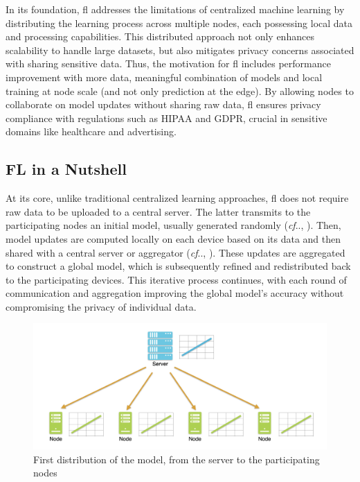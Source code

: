 \documentclass[conference]{IEEEtran}
\makeatletter
\DeclareRobustCommand\onedot{\futurelet\@let@token\@onedot}
\def\@onedot{\ifx\@topicslet@token.\else.\null\fi\xspace}
\def\cf{\emph{cf}\onedot} \def\Cf{\emph{C.f}\onedot}
\makeatother
\begin{document}
In its foundation, \gls{fl} addresses the limitations of centralized machine learning by distributing the learning process across multiple nodes, each possessing local data and processing capabilities.
This distributed approach not only enhances scalability to handle large datasets, but also mitigates privacy concerns associated with sharing sensitive data.
Thus, the motivation for \gls{fl} includes performance improvement with more data, meaningful combination of models and local training at node scale (and not only prediction at the edge).
By allowing nodes to collaborate on model updates without sharing raw data, \gls{fl} ensures privacy compliance with regulations such as HIPAA and GDPR, crucial in sensitive domains like healthcare and advertising.


\subsection{FL in a Nutshell}

At its core, unlike traditional centralized learning approaches, \gls{fl} does not require raw data to be uploaded to a central server.
The latter transmits to the participating nodes an initial model, usually generated randomly (\cf, ).
Then, model updates are computed locally on each device based on its data and then shared with a central server or aggregator (\cf, ).
These updates are aggregated to construct a global model, which is subsequently refined and redistributed back to the participating devices.
This iterative process continues, with each round of communication and aggregation improving the global model's accuracy without compromising the privacy of individual data.



\begin{figure}[t]
    \centering
    \includegraphics[width=\linewidth]{img/FL-phase1.jpg}
    \vspace*{-.8cm}
    \caption{First distribution of the model, from the server to the participating nodes}
    \label{fig:fl-phase1}
\end{figure}
\end{document}
